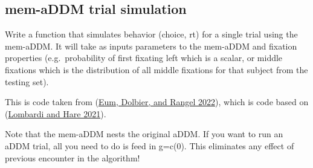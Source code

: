 \documentclass[
]{book}
\begin{document}
\hypertarget{mem-addm-trial-simulation}{%
\subsection{mem-aDDM trial simulation}\label{mem-addm-trial-simulation}}

Write a function that simulates behavior (choice, rt) for a single trial using the mem-aDDM. It will take as inputs parameters to the mem-aDDM and fixation properties (e.g.~probability of first fixating left which is a scalar, or middle fixations which is the distribution of all middle fixations for that subject from the testing set).

This is code taken from (\protect\hyperlink{ref-eum2022}{Eum, Dolbier, and Rangel 2022}), which is code based on (\protect\hyperlink{ref-lombardi2021}{Lombardi and Hare 2021}).

Note that the mem-aDDM nests the original aDDM. If you want to run an aDDM trial, all you need to do is feed in g=c(0). This eliminates any effect of previous encounter in the algorithm!
\end{document}
